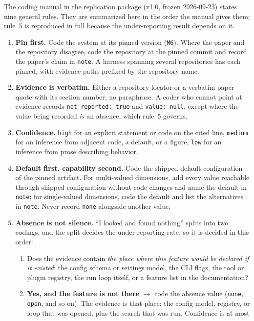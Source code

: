 The coding manual in the replication package (v1.0, frozen 2026-09-23) states nine general rules. They
are summarized here in the order the manual gives them; rule~5 is reproduced in full because the
under-reporting result depends on it.

\begin{enumerate}
\item \textbf{Pin first.} Code the system at its pinned version (\texttt{M6}). Where the paper and
  the repository disagree, code the repository at the pinned commit and record the paper's claim in
  \texttt{note}. A harness spanning several repositories has each pinned, with evidence paths
  prefixed by the repository name.
\item \textbf{Evidence is verbatim.} Either a repository locator or a verbatim paper quote with its
  section number; no paraphrase. A coder who cannot point at evidence records
  \texttt{not\_reported: true} and \texttt{value: null}, except where the value being recorded
  \emph{is} an absence, which rule~5 governs.
\item \textbf{Confidence.} \texttt{high} for an explicit statement or code on the cited line,
  \texttt{medium} for an inference from adjacent code, a default, or a figure, \texttt{low} for an
  inference from prose describing behavior.
\item \textbf{Default first, capability second.} Code the shipped default configuration of the
  pinned artifact. For multi-valued dimensions, add every value reachable through shipped
  configuration without code changes and name the default in \texttt{note}; for single-valued
  dimensions, code the default and list the alternatives in \texttt{note}. Never record
  \texttt{none} alongside another value.
\item \textbf{Absence is not silence.} ``I looked and found nothing'' splits into two codings, and
  the split decides the under-reporting rate, so it is decided in this order:
  \begin{enumerate}
  \item Does the evidence contain \emph{the place where this feature would be declared if it
    existed}: the config schema or settings model, the CLI flags, the tool or plugin registry,
    the run loop itself, or a feature list in the documentation?
  \item \textbf{Yes, and the feature is not there} $\rightarrow$ code the absence value
    (\texttt{none}, \texttt{open}, and so on). The evidence is that place: the config model,
    registry, or loop that was opened, plus the search that was run. Confidence is at most

\end{enumerate}
\end{enumerate}
